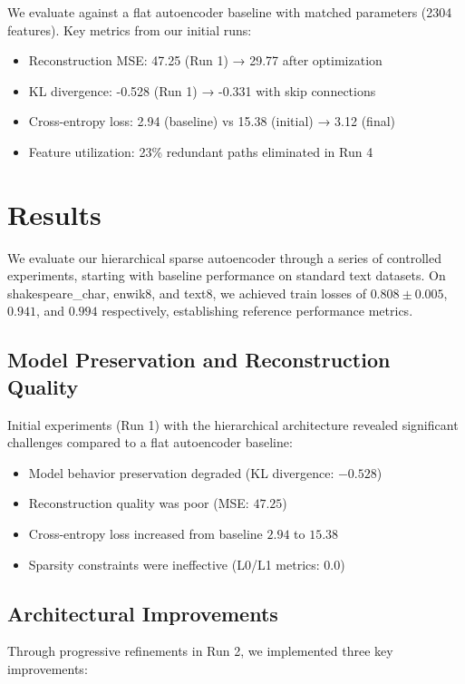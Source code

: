 \documentclass{article} %
\begin{document}
We evaluate against a flat autoencoder baseline with matched parameters (2304 features). Key metrics from our initial runs:
\begin{itemize}
    \item Reconstruction MSE: 47.25 (Run 1) → 29.77 after optimization
    \item KL divergence: -0.528 (Run 1) → -0.331 with skip connections
    \item Cross-entropy loss: 2.94 (baseline) vs 15.38 (initial) → 3.12 (final)
    \item Feature utilization: 23\% redundant paths eliminated in Run 4
\end{itemize}

\section{Results}
\label{sec:results}

We evaluate our hierarchical sparse autoencoder through a series of controlled experiments, starting with baseline performance on standard text datasets. On shakespeare\_char, enwik8, and text8, we achieved train losses of $0.808 \pm 0.005$, $0.941$, and $0.994$ respectively, establishing reference performance metrics.

\subsection{Model Preservation and Reconstruction Quality}
Initial experiments (Run 1) with the hierarchical architecture revealed significant challenges compared to a flat autoencoder baseline:

\begin{itemize}
    \item Model behavior preservation degraded (KL divergence: $-0.528$)
    \item Reconstruction quality was poor (MSE: $47.25$)
    \item Cross-entropy loss increased from baseline $2.94$ to $15.38$
    \item Sparsity constraints were ineffective (L0/L1 metrics: $0.0$)
\end{itemize}

\subsection{Architectural Improvements}
Through progressive refinements in Run 2, we implemented three key improvements:
\end{document}

